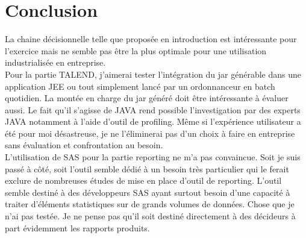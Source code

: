 \chapter{Conclusion}

La chaine décisionnelle telle que proposée en introduction est intéressante pour l'exercice mais ne semble pas être la plus optimale pour une utilisation industrialisée en entreprise. \\
Pour la partie TALEND, j'aimerai tester l'intégration du jar générable dans une application JEE ou tout simplement lancé par un ordonnanceur en batch quotidien. La montée en charge du jar généré doit être intéressante à évaluer aussi. Le fait qu'il s'agisse de JAVA rend possible l'investigation par des experts JAVA notamment à l'aide d'outil de profiling. Même si l'expérience utilisateur a été pour moi désastreuse, je ne l'éliminerai pas d'un choix à faire en entreprise sans évaluation et confrontation au besoin.\\
L'utilisation de SAS pour la partie reporting ne m'a pas convaincue. Soit je suis passé à côté, soit l'outil semble dédié à un besoin très particulier qui le ferait exclure de nombreuses études de mise en place d'outil de reporting. L'outil semble destiné à des développeurs SAS ayant surtout besoin d'une capacité à traiter d'éléments statistiques sur de grands volumes de données. Chose que je n'ai pas testée. Je ne pense pas qu'il soit destiné directement à des décideurs à part évidemment les rapports produits.
